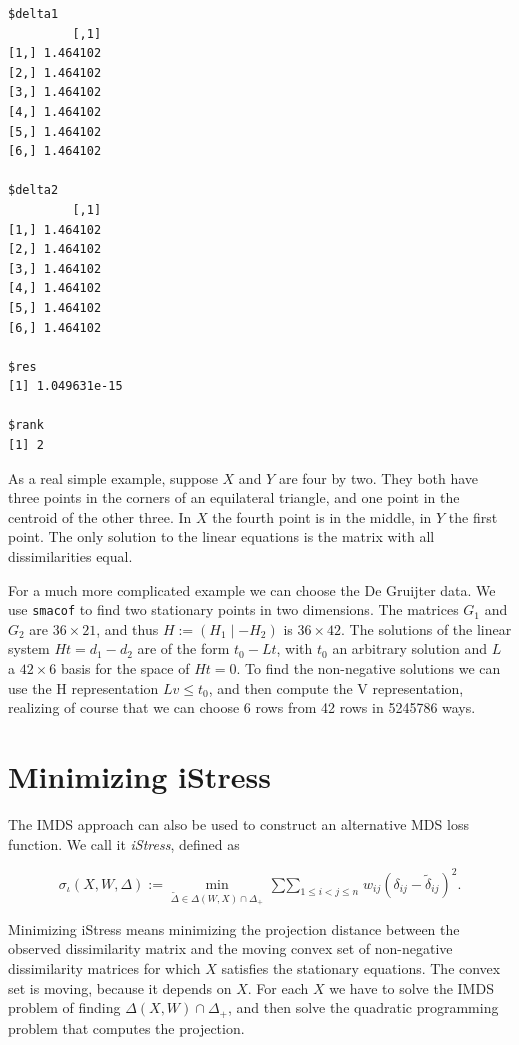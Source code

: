 \documentclass[
  12pt,
  letterpaper,
  DIV=11,
  numbers=noendperiod]{scrreprt}
\theoremstyle{remark}
\begin{document}
\begin{verbatim}
$delta1
         [,1]
[1,] 1.464102
[2,] 1.464102
[3,] 1.464102
[4,] 1.464102
[5,] 1.464102
[6,] 1.464102

$delta2
         [,1]
[1,] 1.464102
[2,] 1.464102
[3,] 1.464102
[4,] 1.464102
[5,] 1.464102
[6,] 1.464102

$res
[1] 1.049631e-15

$rank
[1] 2
\end{verbatim}

As a real simple example, suppose \(X\) and \(Y\) are four by two. They
both have three points in the corners of an equilateral triangle, and
one point in the centroid of the other three. In \(X\) the fourth point
is in the middle, in \(Y\) the first point. The only solution to the
linear equations is the matrix with all dissimilarities equal.

For a much more complicated example we can choose the De Gruijter data.
We use \texttt{smacof} to find two stationary points in two dimensions.
The matrices \(G_1\) and \(G_2\) are \(36\times 21\), and thus
\(H:=(H_1\mid -H_2)\) is \(36\times 42\). The solutions of the linear
system \(Ht=d_1-d_2\) are of the form \(t_0-Lt\), with \(t_0\) an
arbitrary solution and \(L\) a \(42\times 6\) basis for the space of
\(Ht=0\). To find the non-negative solutions we can use the H
representation \(Lv\leq t_0\), and then compute the V representation,
realizing of course that we can choose 6 rows from 42 rows in 5245786
ways.

\section{Minimizing iStress}\label{minimizing-istress}

The IMDS approach can also be used to construct an alternative MDS loss
function. We call it \emph{iStress}, defined as

\[
\sigma_\iota(X,W,\Delta):=\min_{\tilde\Delta\in\Delta(W,X)\cap\Delta_+}\mathop{\sum\sum}_{1\leq i<j\leq n}w_{ij}(\delta_{ij}-\tilde\delta_{ij})^2.
\]

Minimizing iStress means minimizing the projection distance between the
observed dissimilarity matrix and the moving convex set of non-negative
dissimilarity matrices for which \(X\) satisfies the stationary
equations. The convex set is moving, because it depends on \(X\). For
each \(X\) we have to solve the IMDS problem of finding
\(\Delta(X,W)\cap\Delta_+\), and then solve the quadratic programming
problem that computes the projection.
\end{document}
